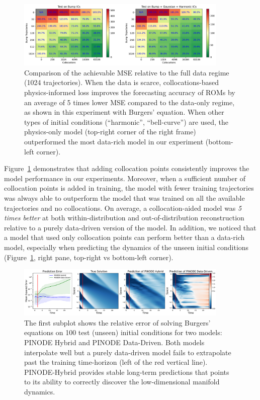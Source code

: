 \begin{figure}[t]
    \centering
    \includegraphics[width=0.9\textwidth]{figures/data_vs_collocations.pdf}
    \caption{Comparison of the achievable MSE relative to the full data regime (1024 trajectories). When the data is scarce, collocations-based physics-informed loss improves the forecasting accuracy of ROMs by an average of 5 times lower MSE compared to the data-only regime, as shown in this experiment with Burgers' equation. When other types of initial conditions (``harmonic'', ``bell-curve'') are used, the physics-only model (top-right corner of the right frame) outperformed the most data-rich model in our experiment (bottom-left corner). }
    \label{fig:burger_data_vs_collocations}
\end{figure}

Figure~\ref{fig:burger_data_vs_collocations} demonstrates that adding collocation points consistently improves the model performance in our experiments.  Moreover, when a sufficient number of collocation points is added in training, the model with fewer training trajectories was always able to outperform the model that was trained on all the available trajectories and no collocations. On average, a collocation-aided model was \textit{5 times better} at both within-distribution and out-of-distribution reconstruction relative to a purely data-driven version of the model. In addition, we noticed that a model that used only collocation points can perform better than a data-rich model, especially when predicting the dynamics of the unseen initial conditions (Figure~\ref{fig:burger_data_vs_collocations}, right pane, top-right vs bottom-left corner). 

\begin{figure}[ht]
    \centering
    \includegraphics[width=0.9\textwidth]{figures/example_burgers.pdf}
    \caption{The first subplot shows the relative error of solving Burgers' equations on 100 test (unseen) initial conditions for two models: PINODE Hybrid and PINODE Data-Driven. Both models interpolate well but a purely data-driven model fails to extrapolate past the training time-horizon (left of the red vertical line). PINODE-Hybrid provides stable long-term predictions that points to its ability to correctly discover the low-dimensional manifold dynamics.}
    \label{fig:burgers_example}
\end{figure}

